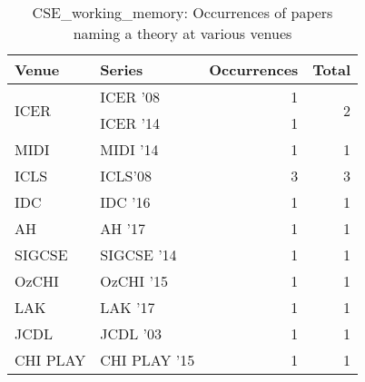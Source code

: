 \begin{table*}[t]
\begin{tabular}{llrr}
Venue & Series & Occurrences & Total\\\hline
\multirow{2}{*}{ICER } & ICER '08 & 1 & \multirow{2}{*}{2}\\
& ICER '14 & 1 &\\
\multirow{1}{*}{MIDI } & MIDI '14 & 1 & \multirow{1}{*}{1}\\
\multirow{1}{*}{ICLS} & ICLS'08 & 3 & \multirow{1}{*}{3}\\
\multirow{1}{*}{IDC } & IDC '16 & 1 & \multirow{1}{*}{1}\\
\multirow{1}{*}{AH } & AH '17 & 1 & \multirow{1}{*}{1}\\
\multirow{1}{*}{SIGCSE } & SIGCSE '14 & 1 & \multirow{1}{*}{1}\\
\multirow{1}{*}{OzCHI } & OzCHI '15 & 1 & \multirow{1}{*}{1}\\
\multirow{1}{*}{LAK } & LAK '17 & 1 & \multirow{1}{*}{1}\\
\multirow{1}{*}{JCDL } & JCDL '03 & 1 & \multirow{1}{*}{1}\\
\multirow{1}{*}{CHI PLAY } & CHI PLAY '15 & 1 & \multirow{1}{*}{1}\\
\end{tabular}
\caption{CSE\_working\_memory: Occurrences of papers naming a theory at various venues}
\end{table*}